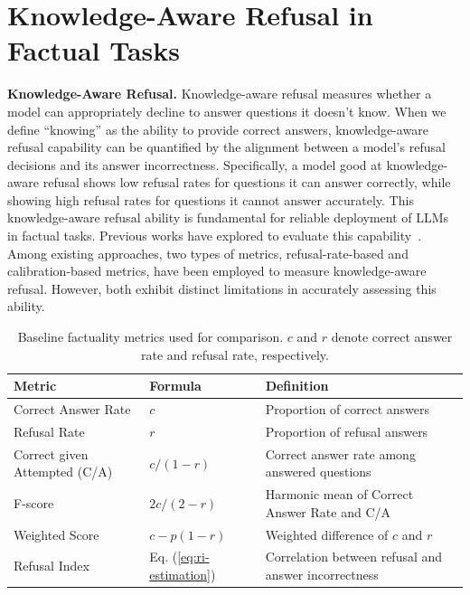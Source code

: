 \vspace{-0.7em}
\section{Knowledge-Aware Refusal in Factual Tasks}
\vspace{-0.7em}
\label{sec:bg}

\noindent\textbf{Knowledge-Aware Refusal.}
Knowledge-aware refusal measures whether a model can appropriately decline to answer questions it doesn't know.
When we define ``knowing'' as the ability to provide correct answers, knowledge-aware refusal capability can be quantified by the alignment between a model's refusal decisions and its answer incorrectness.
Specifically, a model good at knowledge-aware refusal shows low refusal rates for questions it can answer correctly, while showing high refusal rates for questions it cannot answer accurately.
This knowledge-aware refusal ability is fundamental for reliable deployment of LLMs in factual tasks. 
Previous works have explored to evaluate this capability~\citep{cheng2024aiassistantsknowdont, kapoor2024large}. 
Among existing approaches, two types of metrics, refusal-rate-based and calibration-based metrics, have been employed to measure knowledge-aware refusal. 
However, both exhibit distinct limitations in accurately assessing this ability.

\vspace{-0.5em}
\begin{table}[thbp]
    \centering
    \footnotesize
    \caption{Baseline factuality metrics used for comparison. $c$ and $r$ denote correct answer rate and refusal rate, respectively.}
    \vspace{-0.5em}
    \begin{tabularx}{\textwidth}{l l l}
        \toprule
        \textbf{Metric} & \textbf{Formula} & \textbf{Definition} \\
        \midrule
        Correct Answer Rate & $c$ & Proportion of correct answers \\
        Refusal Rate & $r$ & Proportion of refusal answers \\
        Correct given Attempted (C/A) & $c/(1 - r)$ & Correct answer rate among answered questions \\
        F-score & $2c/(2 - r)$ & Harmonic mean of Correct Answer Rate and C/A \\
        Weighted Score & $c - p(1-r)$ & Weighted difference of $c$ and $r$ \\
        \midrule
        Refusal Index & Eq. (\ref{eq:ri-estimation}) & Correlation between refusal and answer incorrectness \\
        \bottomrule
    \end{tabularx}
    \label{tab:baseline_metrics}
    \vspace{-0.5em}
\end{table}


